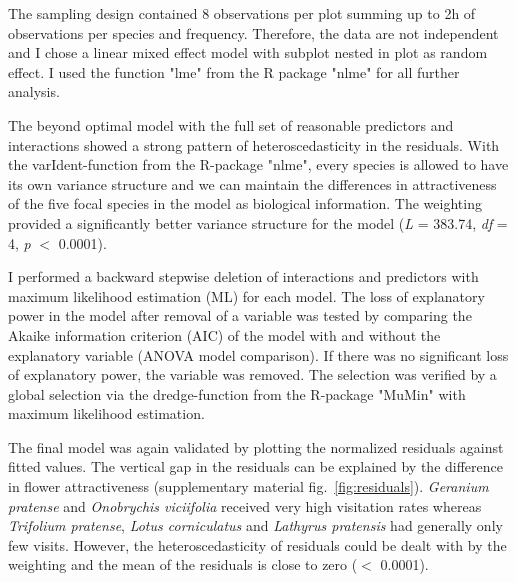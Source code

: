The sampling design contained 8 observations per plot summing up to 2h of observations per species and frequency. Therefore, the data are not independent and I chose a linear mixed effect model with subplot nested in plot as random effect. I used the function "lme" from the R package "nlme" \citep{Rnlme} for all further analysis.

The beyond optimal model with the full set of reasonable predictors and interactions showed a strong pattern of heteroscedasticity in the residuals. With the varIdent-function from the R-package "nlme", every species is allowed to have its own variance structure and we can maintain the differences in attractiveness of the five focal species in the model as biological information. The weighting provided a significantly better variance structure for the model (\textit{L} = 383.74, \textit{df} = 4, \textit{p} $<$ 0.0001).

I performed a backward stepwise deletion of interactions and predictors with maximum likelihood estimation (ML) for each model. The loss of explanatory power in the model after removal of a variable was tested by comparing the Akaike information criterion (AIC) of the model with and without the explanatory variable (ANOVA model comparison). If there was no significant loss of explanatory power, the variable was removed. The selection was verified by a global selection via the dredge-function from the R-package "MuMin" \citep{MuMIn} with maximum likelihood estimation. 


The final model was again validated by plotting the normalized residuals against fitted values. The vertical gap in the residuals can be explained by the difference in flower attractiveness (supplementary material fig.~\ref{fig:residuals}). \textit{Geranium pratense} and \textit{Onobrychis viciifolia} received very high visitation rates whereas \textit{Trifolium pratense}, \textit{Lotus corniculatus} and \textit{Lathyrus pratensis} had generally only few visits. However, the heteroscedasticity of residuals could be dealt with by the weighting and the mean of the residuals is close to zero ($<$ 0.0001). 
